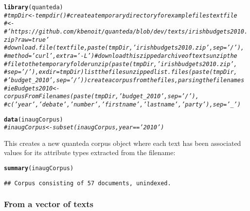 \documentclass[11pt]{article}\usepackage[]{graphicx}\usepackage[]{color}
\makeatletter
\newcommand{\hlcom}[1]{\textcolor[rgb]{0.678,0.584,0.686}{\textit{#1}}}%
\newcommand{\hlstd}[1]{\textcolor[rgb]{0.345,0.345,0.345}{#1}}%
\newcommand{\hlkwd}[1]{\textcolor[rgb]{0.737,0.353,0.396}{\textbf{#1}}}%
\newenvironment{kframe}{%
 \def\at@end@of@kframe{}%
 \ifinner\ifhmode%
  \def\at@end@of@kframe{\end{minipage}}%
  \begin{minipage}{\columnwidth}%
 \fi\fi%
 \def\FrameCommand##1{\hskip\@totalleftmargin \hskip-\fboxsep
 \colorbox{shadecolor}{##1}\hskip-\fboxsep
     \hskip-\linewidth \hskip-\@totalleftmargin \hskip\columnwidth}%
 \MakeFramed {\advance\hsize-\width
   \@totalleftmargin\z@ \linewidth\hsize
   \@setminipage}}%
 {\par\unskip\endMakeFramed%
 \at@end@of@kframe}
\newenvironment{knitrout}{}{} %
\makeatother
\begin{document}
\begin{knitrout}\footnotesize
{}\color{fgcolor}\begin{kframe}
\begin{alltt}
\hlkwd{library}\hlstd{(quanteda)}
\hlcom{# tmpDir <- tempdir() # create a temporary directory for example files textfile}
\hlcom{# <-}
\hlcom{# 'https://github.com/kbenoit/quanteda/blob/dev/texts/irishbudgets2010.zip?raw=true'}
\hlcom{# download.file(textfile, paste(tmpDir, 'irishbudgets2010.zip', sep='/'),}
\hlcom{# method='curl', extra='-L') # download this zipped archive of texts unzip the}
\hlcom{# file to the temporary folder unzip(paste(tmpDir, 'irishbudgets2010.zip',}
\hlcom{# sep='/'), exdir=tmpDir) list the files unzipped list.files(paste(tmpDir,}
\hlcom{# 'budget_2010', sep='/')) create a corpus from the files, parsing the filenames}
\hlcom{# ieBudgets2010 <- corpusFromFilenames(paste(tmpDir, 'budget_2010', sep='/'),}
\hlcom{# c('year', 'debate', 'number', 'firstname', 'lastname', 'party'), sep='_')}

\hlkwd{data}\hlstd{(inaugCorpus)}
\hlcom{# inaugCorpus <- subset(inaugCorpus, year=='2010')}
\end{alltt}
\end{kframe}
\end{knitrout}


This creates a new quanteda corpus object where each text has been associated values for its attribute types extracted from the filename:

\begin{knitrout}\footnotesize
{}\color{fgcolor}\begin{kframe}
\begin{alltt}
\hlkwd{summary}\hlstd{(inaugCorpus)}
\end{alltt}
\begin{verbatim}
## Corpus consisting of 57 documents, unindexed.
\end{verbatim}


{\ttfamily\noindent\bfseries\color{errorcolor}{\#\# Error: arguments imply differing number of rows: 57, 0}}\end{kframe}
\end{knitrout}


\subsubsection{From a vector of texts}
\end{document}

